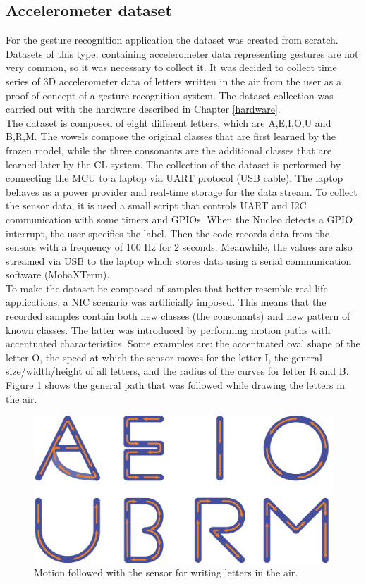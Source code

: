 \documentclass[12pt]{report}
\begin{document}
\subsection{Accelerometer dataset}
For the gesture recognition application the dataset was created from scratch. Datasets of this type, containing accelerometer data representing gestures are not very common, so it was necessary to collect it. It was decided to collect time series of 3D accelerometer data of letters written in the air from the user as a proof of concept of a gesture recognition system.
The dataset collection was carried out with the hardware described in Chapter \ref{hardware}. \\
The dataset is composed of eight different letters, which are A,E,I,O,U and B,R,M. The vowels compose the original classes that are first learned by the frozen model, while the three consonants are the additional classes that are learned later by the CL system. The collection of the dataset is performed by connecting the MCU to a laptop via UART protocol (USB cable). The laptop behaves as a power provider and real-time storage for the data stream. 
To collect the sensor data, it is used a small script that controls UART and I2C communication with some timers and GPIOs. When the Nucleo detects a GPIO interrupt, the user specifies the label. Then the code records data from the sensors with a frequency of 100 Hz for 2 seconds. Meanwhile, the values are also streamed via USB to the laptop which stores data using a serial communication software (MobaXTerm). \\
To make the dataset be composed of samples that better resemble real-life applications, a NIC scenario was artificially imposed. This means that the recorded samples contain both new classes (the consonants) and new pattern of known classes. The latter was introduced by performing motion paths with accentuated characteristics. Some examples are: the accentuated oval shape of the letter O, the speed at which the sensor moves for the letter I, the general size/width/height of all letters, and the radius of the curves for letter R and B.
Figure \ref{fig:letters_motion} shows the general path that was followed while drawing the letters in the air.\\

\begin{figure}[h!]
    \centering
    \includegraphics[width=120mm]{Figures/Chapter4/letters_motion.jpg} 
    \caption{Motion followed with the sensor for writing letters in the air.}
    \label{fig:letters_motion}    
\end{figure}
\end{document}
